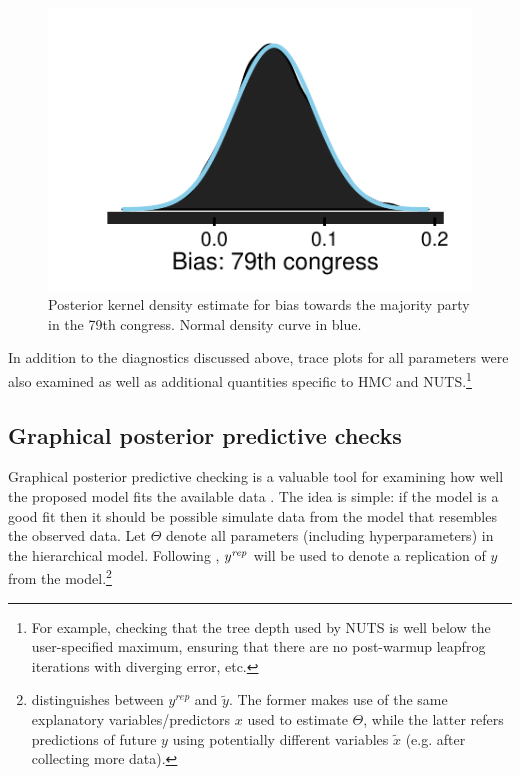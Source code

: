 \begin{figure}[h]
\centering
	\includegraphics[scale=0.75]{sections/figs/example_posterior}
\caption{Posterior kernel density estimate for bias towards the majority party in the 79th congress. Normal density curve in blue.}
\label{fig:ck_example_posterior}
\end{figure}


%
%
%

In addition to the diagnostics discussed above, trace plots for all parameters were also examined as well as additional quantities specific to HMC and NUTS.\footnote{For example, checking that the tree depth used by NUTS is well below the user-specified maximum, ensuring that there are no post-warmup leapfrog iterations with diverging error, etc.}




\subsection{Graphical posterior predictive checks}
\label{subsection_model_checking}

Graphical posterior predictive checking is a valuable tool for examining how well the proposed model fits the available data . The idea is simple: if the model is a good fit then it should be possible simulate data from the model that resembles the observed data. Let $\Theta$ denote all parameters (including hyperparameters) in the hierarchical model. Following  , $y^{\it rep}$ will be used to denote a replication of $y$ from the model.\footnote{ distinguishes between $y^{rep}$ and $\tilde{y}$. The former makes use of the same explanatory variables/predictors $x$ used to estimate $\Theta$, while the latter refers predictions of future $y$ using potentially different variables $\tilde{x}$ (e.g. after collecting more data).}

